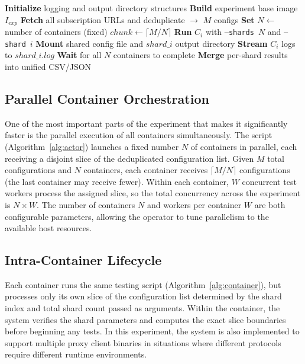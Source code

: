 \documentclass[10pt,conference]{IEEEtran}
\begin{document}
\begin{algorithm}[t]
\caption{Actor Script Orchestration and Parallel Container Execution}
\label{alg:actor}
\begin{algorithmic}[1]
    \State \textbf{Initialize} logging and output directory structures
    \State \textbf{Build} experiment base image $I_{exp}$
    \State \textbf{Fetch} all subscription URLs and deduplicate $\rightarrow$ $M$ configs
    \State \textbf{Set} $N \leftarrow$ number of containers (fixed)
    \State $chunk \leftarrow \lceil M / N \rceil$
        \State \textbf{Run} $C_i$ with \texttt{--shards}~$N$ and \texttt{--shard}~$i$
        \State \textbf{Mount} shared config file and $shard\_i$ output directory
        \State \textbf{Stream} $C_i$ logs to $shard\_i.log$
    \EndFor
    \State \textbf{Wait} for all $N$ containers to complete
    \State \textbf{Merge} per-shard results into unified CSV/JSON
\end{algorithmic}
\end{algorithm}

\subsection{Parallel Container Orchestration}
One of the most important parts of the experiment that makes it significantly faster is the parallel execution of all containers simultaneously.
The script (Algorithm~\ref{alg:actor}) launches a fixed number $N$ of containers in parallel, each receiving a disjoint slice of the deduplicated configuration list.
Given $M$ total configurations and $N$ containers, each container receives $\lceil M/N \rceil$ configurations (the last container may receive fewer).
Within each container, $W$ concurrent test workers process the assigned slice, so the total concurrency across the experiment is $N \times W$.
The number of containers $N$ and workers per container $W$ are both configurable parameters, allowing the operator to tune parallelism to the available host resources.

\subsection{Intra-Container Lifecycle}
Each container runs the same testing script (Algorithm~\ref{alg:container}), but processes only its own slice of the configuration list determined by the shard index and total shard count passed as arguments.
Within the container, the system verifies the shard parameters and computes the exact slice boundaries before beginning any tests.
In this experiment, the system is also implemented to support multiple proxy client binaries in situations where different protocols require different runtime environments.
\end{document}
